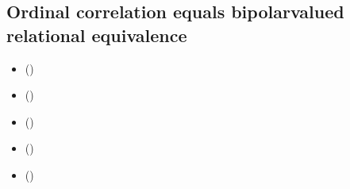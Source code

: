 \documentclass[a4paper,12pt,english]{sphinxhowto}
\begin{document}
\subsection{Ordinal correlation equals bipolar\sphinxhyphen{}valued relational equivalence}
\label{\detokenize{pearls:ordinal-correlation-equals-bipolar-valued-relational-equivalence}}\label{\detokenize{pearls:ordinalcorrelation-tutorial-label}}
\begin{sphinxcontents}
\begin{itemize}
\item {} 
\sphinxAtStartPar
{}\label{\detokenize{pearls:id177}}{\hyperref[\detokenize{pearls:kendall-s-tau-index}]{}} ()

\item {} 
\sphinxAtStartPar
{}\label{\detokenize{pearls:id178}}{\hyperref[\detokenize{pearls:bipolar-valued-relational-equivalence}]{}} ()

\item {} 
\sphinxAtStartPar
{}\label{\detokenize{pearls:id179}}{\hyperref[\detokenize{pearls:fitness-of-ranking-heuristics}]{}} ()

\item {} 
\sphinxAtStartPar
{}\label{\detokenize{pearls:id180}}{\hyperref[\detokenize{pearls:illustrating-preference-divergences}]{}} ()

\item {} 
\sphinxAtStartPar
{}\label{\detokenize{pearls:id181}}{\hyperref[\detokenize{pearls:exploring-the-better-rated-and-the-as-well-as-rated-opinions}]{}} ()

\end{itemize}
\end{sphinxcontents}
\end{document}
